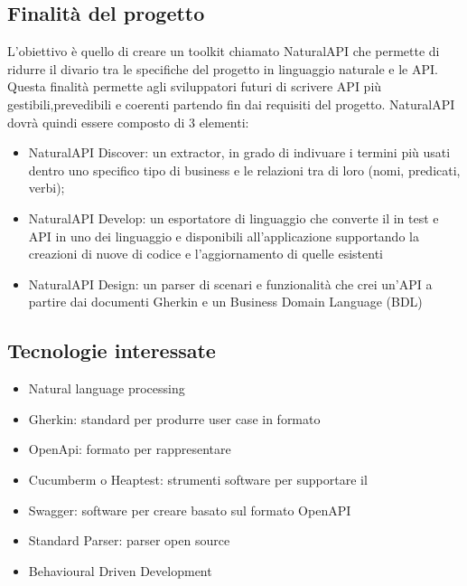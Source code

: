 \documentclass[../studio-di-fattibilita.tex]{subfiles}
\begin{document}
\subsection{Finalità del progetto}%
\label{finalita_del_progetto}
L'obiettivo è quello di creare un toolkit  chiamato NaturalAPI che permette di ridurre il divario tra le specifiche del progetto in linguaggio naturale e le API. Questa finalità permette agli sviluppatori futuri di scrivere API più gestibili,prevedibili e coerenti partendo fin dai requisiti del progetto. NaturalAPI dovrà quindi essere composto di 3 elementi: 
\begin{itemize}
  \item NaturalAPI Discover: un  extractor, in grado di indivuare i termini più usati dentro uno specifico tipo di business e le relazioni tra di loro (nomi, predicati, verbi);
  \item NaturalAPI Develop: un esportatore di linguaggio che converte il  in test e API in uno dei linguaggio e  disponibili all'applicazione supportando la creazioni di nuove  di codice e l'aggiornamento di quelle esistenti 
  \item NaturalAPI Design: un parser di scenari e funzionalità che crei un'API  a partire dai documenti Gherkin e un Business Domain Language (BDL) 
\end{itemize}

\subsection{Tecnologie interessate}%
\label{tecnologie_interessate}
\begin{itemize}
  \item Natural language processing
  \item Gherkin: standard per produrre user case in formato 
  \item OpenApi: formato per rappresentare 
  \item Cucumberm o Heaptest: strumenti software per supportare il 
  \item Swagger: software  per creare  basato sul formato OpenAPI
  \item Standard Parser: parser open source
  \item Behavioural Driven Development
\end{itemize}
\end{document}
